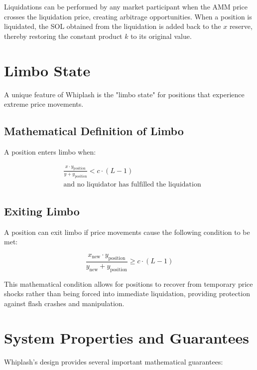 \documentclass[11pt]{article}
\begin{document}
Liquidations can be performed by any market participant when the AMM price crosses the liquidation price, creating arbitrage opportunities.
When a position is liquidated, the SOL obtained from the liquidation is added back to the $x$ reserve, thereby restoring the constant product $k$ to its original value.

\section{Limbo State}

A unique feature of Whiplash is the "limbo state" for positions that experience extreme price movements.

\subsection{Mathematical Definition of Limbo}

A position enters limbo when:

\begin{equation}
\begin{aligned}
&\frac{x \cdot y_{\text{position}}}{y + y_{\text{position}}} < c \cdot (L - 1) \\
&\text{and no liquidator has fulfilled the liquidation}
\end{aligned}
\end{equation}

\subsection{Exiting Limbo}

A position can exit limbo if price movements cause the following condition to be met:

\begin{equation}
\frac{x_{\text{new}} \cdot y_{\text{position}}}{y_{\text{new}} + y_{\text{position}}} \geq c \cdot (L - 1)
\end{equation}

This mathematical condition allows for positions to recover from temporary price shocks rather than being forced into immediate liquidation, providing protection against flash crashes and manipulation.

\section{System Properties and Guarantees}

Whiplash's design provides several important mathematical guarantees:
\end{document}
